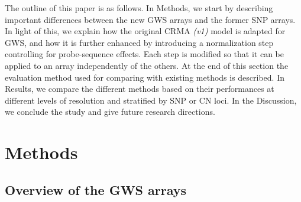 \documentclass{bioinfo}
\newcommand{\updated}[3][MyDarkRed]{{{\color{#1}\textsl{#2}}\endnote{#3 \color{#1}\textsl{#2}}}\xspace}
\newcommand{\updated}[3][]{#2\xspace}
\newcommand{\GWS}{GWS\xspace}
\begin{document}
The outline of this paper is as follows. 
In Methods, we start by describing important differences between the new \GWS arrays and the former SNP arrays.  
In light of this, we explain how the original CRMA \updated{(v1)}{ADDED:} model is adapted for \GWS, and how it is further enhanced by introducing a normalization step controlling for probe-sequence effects.  
Each step is modified so that it can be applied to an array independently of the others.
At the end of this section the evaluation method used for comparing with existing methods is described.
In Results, we compare the different methods based on their performances at different levels of resolution and stratified by SNP or CN loci.
In the Discussion, we conclude the study and give future research directions.



\section{Methods}
\subsection{Overview of the \GWS arrays}
\end{document}
